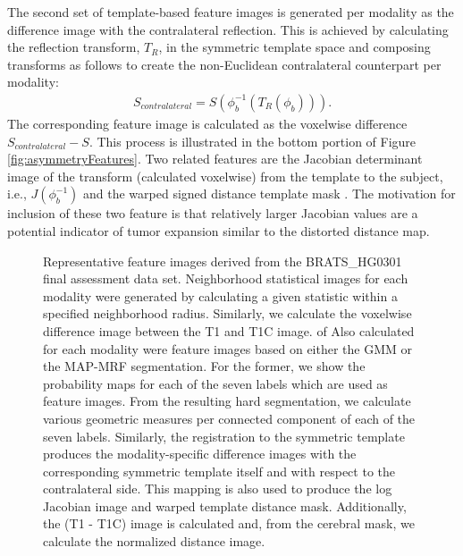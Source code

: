 The second
set of template-based feature images is generated per modality 
as the difference image with the contralateral reflection.  This is achieved by calculating the 
reflection transform, $T_R$, in the symmetric template space and composing transforms
as follows to create the non-Euclidean contralateral counterpart per modality:
\begin{align}
  S_{contralateral} = S\left( \phi_b^{-1}\left( T_R\left( \phi_b \right)\right)\right).
\end{align}
The corresponding feature image is calculated as the voxelwise difference $S_{contralateral} - S$.
This process is illustrated in the bottom portion of Figure \ref{fig:asymmetryFeatures}. Two 
related features are the Jacobian determinant image 
of the transform (calculated voxelwise) from the template to the subject, i.e., $J(\phi_b^{-1})$
and the warped signed distance template mask \citep{maurer2003}.
The motivation for inclusion of these two feature is that 
relatively larger Jacobian values are a potential indicator of tumor
expansion similar to the distorted distance map.


\begin{figure}
\centering
  \caption{Representative feature images derived from the 
           BRATS\_HG0301  final assessment data set.
           Neighborhood statistical images for each modality were 
           generated by calculating a given statistic within
           a specified neighborhood radius.  Similarly, we 
           calculate the voxelwise difference image between the
           T1 and T1C image.  
           of 
           Also calculated for each modality were feature
           images based on either the GMM or the MAP-MRF segmentation.  For the former, we
           show the probability maps for each of the seven labels which are used as feature
           images.  From the resulting hard segmentation, we calculate various geometric 
           measures per connected component of each of the seven labels.  Similarly, the 
           registration to the symmetric template produces the modality-specific 
           difference images with the
           corresponding symmetric template itself and with respect to the 
           contralateral side.   This mapping is also used to produce the log Jacobian image
           and warped template distance mask.  Additionally, the 
           (T1 - T1C) image is calculated and, from the
           cerebral mask, we calculate the normalized distance image.  
           }
  \label{fig:featureImages}         
\end{figure}

